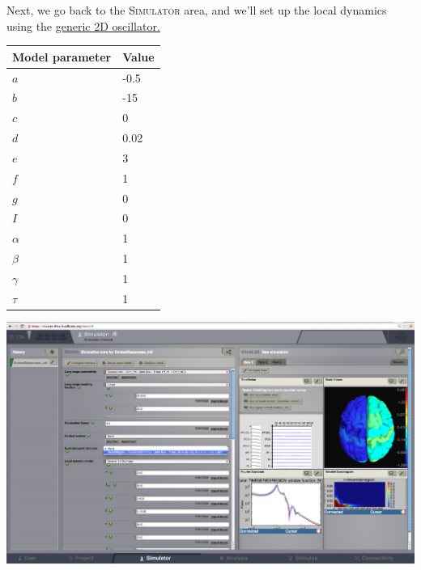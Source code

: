 \documentclass{tufte-handout}
\begin{document}
{Next, we go back to the} \textsc{Simulator} area, and we'll set up the local dynamics using the \underline{generic 2D oscillator.}
\begin{margintable}
  \centering
  \selectfont
  \begin{tabular}{ll}
    \toprule
    Model parameter & Value \\
    \midrule
             $a$          &   -0.5   \\
             $b$          &  -15    \\
             $c$           &   0        \\
             $d$           &   0.02    \\
             $e$           &   3        \\
             $f$            &   1    \\
             $g$           &   0        \\
             $I$            &   0        \\
             $\alpha$   &   1        \\
             $\beta$     &   1     \\
             $\gamma$&   1       \\
             $\tau$       &   1 \\
    \bottomrule
  \end{tabular}
  \caption{In this configuration the topology of the phase portrait features a stable fixed point (a stable spiral) with a characteristic frequency of approximately \unit[10]{Hz}. }
  \label{tab:modeltab}
\end{margintable}
\begin{marginfigure}
  \includegraphics[width=\linewidth]{Handout_UI_HeterogenousModelAndStimulation_RegionAddStimulus}%
  \caption{Add a stimulation pattern}%
  \label{fig:add_stimulus}%
\end{marginfigure}
\end{document}
